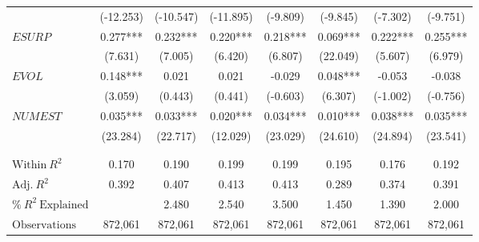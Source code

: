 \begin{xltabular}{\linewidth}{X * {7}{S[table-format=4.3]}}
 & (-12.253) & (-10.547) & (-11.895) & (-9.809) & (-9.845) & (-7.302) & (-9.751)\\
\addlinespace
$ESURP$ & 0.277*** & 0.232*** & 0.220*** & 0.218*** & 0.069*** & 0.222*** & 0.255***\\
 & (7.631) & (7.005) & (6.420) & (6.807) & (22.049) & (5.607) & (6.979)\\
\addlinespace
$EVOL$ & 0.148*** & 0.021 & 0.021 & -0.029 & 0.048*** & -0.053 & -0.038\\
 & (3.059) & (0.443) & (0.441) & (-0.603) & (6.307) & (-1.002) & (-0.756)\\
\addlinespace
$NUMEST$ & 0.035*** & 0.033*** & 0.020*** & 0.034*** & 0.010*** & 0.038*** & 0.035***\\
 & (23.284) & (22.717) & (12.029) & (23.029) & (24.610) & (24.894) & (23.541)\\
 &  &  &  &  &  &  \vphantom{1} & \\
\midrule
 &  &  &  &  &  &  & \\
$\textrm{Within} \: R^2$ & {0.170} & {0.190} & {0.199} & {0.199} & {0.195} & {0.176} & {0.192}\\
$\textrm{Adj.} \: R^2$ & {0.392} & {0.407} & {0.413} & {0.413} & {0.289} & {0.374} & {0.391}\\
$\% \: R^2 \: \textrm{Explained}$ & {} & {2.480} & {2.540} & {3.500} & {1.450} & {1.390} & {2.000}\\
$\textrm{Observations}$ & {872,061} & {872,061} & {872,061} & {872,061} & {872,061} & {872,061} & {872,061}\\*
\end{xltabular}
\endgroup{}